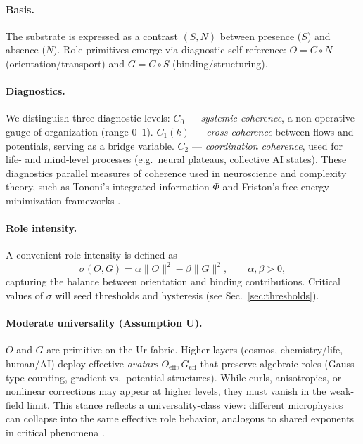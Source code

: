 \documentclass[12pt,a4paper,oneside]{scrreprt}
\begin{document}
\paragraph{Basis.} 
The substrate is expressed as a contrast $(S,N)$ between presence ($S$) and absence ($N$). 
Role primitives emerge via diagnostic self-reference: 
$O = C \circ N$ (orientation/transport) and $G = C \circ S$ (binding/structuring).  

\paragraph{Diagnostics.} 
We distinguish three diagnostic levels:  
$C_0$ --- \emph{systemic coherence}, a non-operative gauge of organization (range $0$–$1$).  
$C_1(k)$ --- \emph{cross-coherence} between flows and potentials, serving as a bridge variable.  
$C_2$ --- \emph{coordination coherence}, used for life- and mind-level processes (e.g.\ neural plateaus, collective AI states).  
These diagnostics parallel measures of coherence used in neuroscience and complexity theory, such as Tononi’s integrated information $\Phi$ \citep{Tononi2004IIT} and Friston’s free-energy minimization frameworks \citep{Friston2010FEP}.

\paragraph{Role intensity.} 
A convenient role intensity is defined as
\begin{equation}
\sigma(O,G) = \alpha \|O\|^2 - \beta \|G\|^2, 
\qquad \alpha,\beta>0,
\end{equation}
capturing the balance between orientation and binding contributions. 
Critical values of $\sigma$ will seed thresholds and hysteresis (see Sec.~\ref{sec:thresholds}).

\paragraph{Moderate universality (Assumption U).} 
$O$ and $G$ are primitive on the Ur-fabric. 
Higher layers (cosmos, chemistry/life, human/AI) deploy effective \emph{avatars} $O_{\mathrm{eff}}, G_{\mathrm{eff}}$ that preserve algebraic roles (Gauss-type counting, gradient vs.\ potential structures). 
While curls, anisotropies, or nonlinear corrections may appear at higher levels, they must vanish in the weak-field limit. 
This stance reflects a universality-class view: different microphysics can collapse into the same effective role behavior, analogous to shared exponents in critical phenomena \citep{Wilson1971RG}. 
\end{document}
